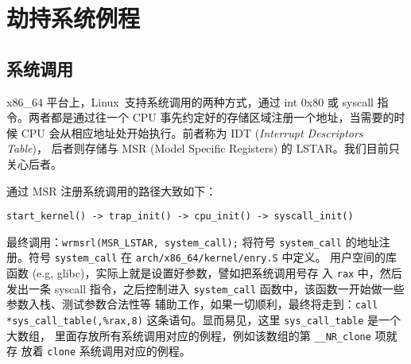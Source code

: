 \section{劫持系统例程}
\subsection{系统调用}
x86\_64 平台上，Linux~支持系统调用的两种方式，通过 int 0x80 或 syscall 指
令。两者都是通过往一个 CPU 事先约定好的存储区域注册一个地址，当需要的时候
CPU 会从相应地址处开始执行。前者称为 IDT (\textit{Interrupt Descriptors Table})，
后者则存储与 MSR (Model Specific Registers) 的 LSTAR。我们目前只关心后者。

通过 MSR 注册系统调用的路径大致如下：

\begin{verbatim}
start_kernel() -> trap_init() -> cpu_init() -> syscall_init()
\end{verbatim}

最终调用：\verb=wrmsrl(MSR_LSTAR, system_call);= 将符号 \verb=system_call= 的地址注
册。符号 \verb=system_call= 在 \verb=arch/x86_64/kernel/enry.S= 中定义。
用户空间的库函数  (e.g, glibc)，实际上就是设置好参数，譬如把系统调用号存
入 \verb=rax= 中，然后发出一条 syscall 指令，之后控制进入 
\verb=system_call=   函数中，该函数一开始做一些参数入栈、测试参数合法性等
辅助工作，如果一切顺利，最终将走到：\verb=call *sys_call_table(,%rax,8)= 
这条语句。显而易见，这里 \verb=sys_call_table= 是一个大数组，
里面存放所有系统调用对应的例程，例如该数组的第  \verb=__NR_clone= 项就存
放着 \verb=clone= 系统调用对应的例程。





